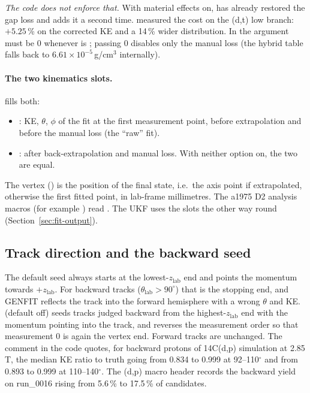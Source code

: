 \emph{The code does not enforce that.} With material effects on,  has already restored the
gap loss and  adds it a second time.  measured the cost on the (d,t) low
branch: $+5.25$\,\% on the corrected KE and a 14\,\% wider distribution. In  the
argument  must be 0 whenever  is ; passing 0 disables only the
manual loss (the hybrid table falls back to $6.61\times10^{-5}$\,g/cm$^3$ internally).

\paragraph{The two kinematics slots.}  fills both:
\begin{itemize}
\item {}: KE, $\theta$, $\phi$ of the fit at the first measurement point, before extrapolation and
  before the manual loss (the ``raw'' fit).
\item {}: after back-extrapolation and manual loss. With neither option on, the two are equal.
\end{itemize}
The vertex () is the position of the final state, i.e.\ the axis point if extrapolated, otherwise the
first fitted point, in lab-frame millimetres. The a1975 D2 analysis macros (for example ) read . The UKF uses
the slots the other way round (Section~\ref{sec:fit-output}).

\subsection{Track direction and the backward seed}
\label{sec:gf-direction}

The default seed always starts at the lowest-$z_\mathrm{lab}$ end and points the momentum towards $+z_\mathrm{lab}$.
For backward tracks ($\theta_\mathrm{lab}>90^\circ$) that is the stopping end, and GENFIT reflects the track into the
forward hemisphere with a wrong $\theta$ and KE.  (default off) seeds tracks judged
backward from the highest-$z_\mathrm{lab}$ end with the momentum pointing into the track, and reverses the measurement
order so that measurement 0 is again the vertex end. Forward tracks are unchanged. The comment in the code quotes, for
backward protons of 14C(d,p) simulation at 2.85\,T, the median KE ratio to truth going from 0.834 to 0.999 at
92--110$^\circ$ and from 0.893 to 0.999 at 110--140$^\circ$. The (d,p) macro header records the backward yield on
run\_0016 rising from 5.6\,\% to 17.5\,\% of candidates.


